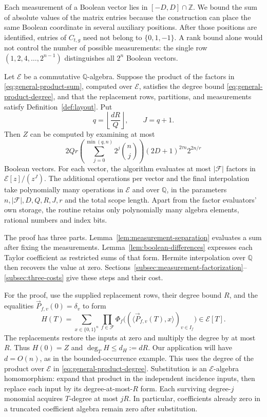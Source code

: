 Each measurement of a Boolean vector lies in $[-D,D]\cap\mathbb Z$.
We bound the sum of absolute values of the matrix entries because
the construction can place the same Boolean coordinate in several
auxiliary positions. After those positions are identified, entries
of $C_{t,g}$ need not belong to $\{0,1,-1\}$. A rank bound alone
would not control the number of possible measurements: the single
row $(1,2,4,\ldots,2^{n-1})$ distinguishes all $2^n$ Boolean vectors.

\begin{proposition}\label{prop:general-count}
Let $\mathcal E$ be a commutative $\mathbb Q$-algebra. Suppose the
product of the factors in \eqref{eq:general-product-sum}, computed
over $\mathcal E$, satisfies the degree bound \eqref{eq:general-product-degree},
and that the replacement rows, partitions, and measurements satisfy
Definition~\ref{def:layout}. Put
\begin{equation}\label{eq:hasse-order}
 q=\left\lfloor\frac{dR}{Q}\right\rfloor,\qquad J=q+1.
\end{equation}
Then $Z$ can be computed by examining at most
\[
 2Qr\left(\sum_{j=0}^{\min(q,n)}2^j\binom nj\right)(2D+1)^{2\tau n}2^{2n/r}
\]
Boolean vectors. For each vector, the algorithm evaluates at most $|\mathcal F|$
factors in $\mathcal E[z]/(z^J)$. The additional operations per
vector and the final interpolation take polynomially many operations
in $\mathcal E$ and over $\mathbb Q$, in the parameters
$n,|\mathcal F|,D,Q,R,J,r$ and the total scope length.
Apart from the factor evaluators' own storage, the routine retains
only polynomially many algebra elements, rational numbers and index bits.
\end{proposition}
The proof has three parts. Lemma~\ref{lem:measurement-separation}
evaluates a sum after fixing the measurements. Lemma~\ref{lem:boolean-differences}
expresses each Taylor coefficient as restricted sums of that form.
Hermite interpolation over $\mathbb Q$ then recovers the value at zero.
Sections~\ref{subsec:measurement-factorization}--\ref{subsec:three-costs}
give these steps and their cost.

For the proof, use the supplied replacement rows, their degree
bound $R$, and the equalities
$\vec P_{f,v}(0)=\delta_v$ to form
\begin{equation}\label{eq:general-count-polynomial}
 H(T)=\sum_{x\in\{0,1\}^n}\prod_{f\in\mathcal F}
   \Phi_f\bigl((\langle\vec P_{f,v}(T),x\rangle)_{v\in I_f}\bigr)
   \in\mathcal E[T].
\end{equation}
The replacements restore the inputs at zero and multiply the degree by
at most $R$. Thus $H(0)=Z$ and $\deg_T H\le d_H:=dR$. Our application
will have $d=O(n)$, as in the bounded-occurrence example.
This uses the degree of the product over $\mathcal E$ in
\eqref{eq:general-product-degree}. Substitution is an
$\mathcal E$-algebra homomorphism: expand that product in the
independent incidence inputs, then replace each input by its
degree-at-most-$R$ form. Each surviving degree-$j$ monomial acquires
$T$-degree at most $jR$. In particular, coefficients already zero
in a truncated coefficient algebra remain zero after substitution.

